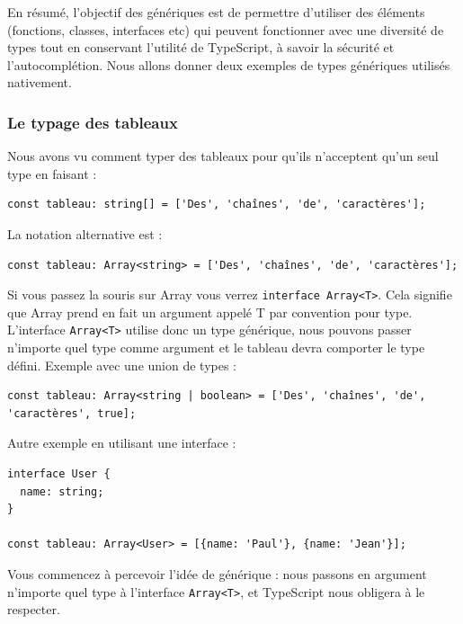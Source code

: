 En résumé, l'objectif des génériques est de permettre d'utiliser des éléments (fonctions, classes, interfaces etc) qui peuvent fonctionner avec une diversité de types tout en conservant l'utilité de {\color{monOrange}TypeScript}, à savoir la sécurité et l'autocomplétion. Nous allons donner deux exemples de types génériques utilisés nativement.

\subsubsection{Le typage des tableaux}
Nous avons vu comment typer des tableaux pour qu'ils n'acceptent qu'un seul type en faisant :
\begin{verbatim}
const tableau: string[] = ['Des', 'chaînes', 'de', 'caractères'];
\end{verbatim}
La notation alternative est :
\begin{verbatim}
const tableau: Array<string> = ['Des', 'chaînes', 'de', 'caractères'];
\end{verbatim}
Si vous passez la souris sur {\color{monOrange}Array} vous verrez {\tt interface Array<T>}. Cela signifie que {\color{monOrange}Array} prend en fait un argument appelé {\color{monOrange}T} par convention pour type. L'interface {\tt Array<T>} utilise donc un type générique, nous pouvons passer n'importe quel type comme argument et le tableau devra comporter le type défini. Exemple avec une union de types :
\begin{verbatim}
const tableau: Array<string | boolean> = ['Des', 'chaînes', 'de', 'caractères', true];
\end{verbatim}
Autre exemple en utilisant une {\color{monOrange}interface} :
\begin{verbatim}
interface User {
  name: string;
}

const tableau: Array<User> = [{name: 'Paul'}, {name: 'Jean'}];
\end{verbatim}
Vous commencez à percevoir l'idée de générique : nous passons en argument n'importe quel type à l'interface {\tt Array<T>}, et {\color{monOrange}TypeScript} nous obligera à le respecter.

